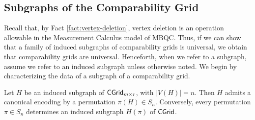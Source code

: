 \subsection{Subgraphs of the Comparability Grid}

Recall that, by Fact \ref{fact:vertex-deletion}, vertex deletion is an operation allowable in the Measurement Calculus model of MBQC. Thus, if we can show that a family of induced subgraphs of comparability grids is universal, we obtain that comparability grids are universal. Henceforth, when we refer to a subgraph, assume we refer to an induced subgraph unless otherwise noted. We begin by characterizing the data of a subgraph of a comparability grid.

\begin{fact}
\label{fact:tuple-construction}
Let \(H\) be an induced subgraph of $\mathsf{CGrid}_{m \times r}$, with
\(|V(H)|=n\). Then \(H\) admits a canonical encoding by a permutation
\(\pi(H)\in S_n\). Conversely, every permutation \(\pi\in S_n\) determines
an induced subgraph \(H(\pi)\) of \(\mathsf{CGrid}\).
\end{fact}

